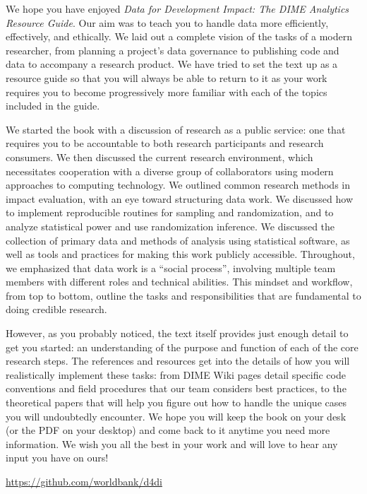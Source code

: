 We hope you have enjoyed \textit{Data for Development Impact: The DIME Analytics Resource Guide}.
Our aim was to teach you to handle data more efficiently, effectively, and ethically. 
We laid out a complete vision of the tasks of a modern researcher,
from planning a project's data governance to publishing code and data
to accompany a research product.
We have tried to set the text up as a resource guide
so that you will always be able to return to it
as your work requires you to become progressively more familiar
with each of the topics included in the guide.

We started the book with a discussion of research as a public service:
one that requires you to be accountable to both research participants
and research consumers.
We then discussed the current research environment,
which necessitates cooperation with a diverse group of collaborators
using modern approaches to computing technology.
We outlined common research methods in impact evaluation, 
with an eye toward structuring data work.
We discussed how to implement reproducible routines for sampling and randomization,
and to analyze statistical power and use randomization inference.
We discussed the collection of primary data
and methods of analysis using statistical software,
as well as tools and practices for making this work publicly accessible.
Throughout, we emphasized that data work is a ``social process'', 
involving multiple team members with different roles and technical abilities.  
This mindset and workflow, from top to bottom,
outline the tasks and responsibilities
that are fundamental to doing credible research. 

However, as you probably noticed, the text itself provides
just enough detail to get you started:
an understanding of the purpose and function of each of the core research steps.
The references and resources get into the details
of how you will realistically implement these tasks: 
from DIME Wiki pages detail specific code conventions 
and field procedures that our team considers best practices,
to the theoretical papers that will help you figure out
how to handle the unique cases you will undoubtedly encounter.
We hope you will keep the book on your desk
(or the PDF on your desktop)
and come back to it anytime you need more information.
We wish you all the best in your work
and will love to hear any input you have on ours!

\url{https://github.com/worldbank/d4di}
